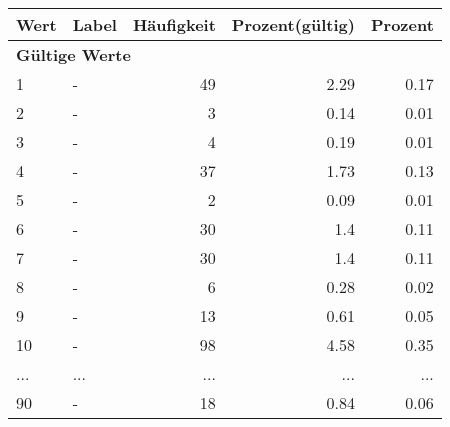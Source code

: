     \begin{longtable}{lXrrr}
     \toprule
     \textbf{Wert} & \textbf{Label} & \textbf{Häufigkeit} & \textbf{Prozent(gültig)} & \textbf{Prozent} \\
     \endhead
     \midrule
     \multicolumn{5}{l}{\textbf{Gültige Werte}}\\
        1 & \multicolumn{1}{X}{-} & %
          \num{49} &
          \num[round-mode=places,round-precision=2]{2.29} &
          \num[round-mode=places,round-precision=2]{0.17} \\
        2 & \multicolumn{1}{X}{-} & %
          \num{3} &
          \num[round-mode=places,round-precision=2]{0.14} &
          \num[round-mode=places,round-precision=2]{0.01} \\
        3 & \multicolumn{1}{X}{-} & %
          \num{4} &
          \num[round-mode=places,round-precision=2]{0.19} &
          \num[round-mode=places,round-precision=2]{0.01} \\
        4 & \multicolumn{1}{X}{-} & %
          \num{37} &
          \num[round-mode=places,round-precision=2]{1.73} &
          \num[round-mode=places,round-precision=2]{0.13} \\
        5 & \multicolumn{1}{X}{-} & %
          \num{2} &
          \num[round-mode=places,round-precision=2]{0.09} &
          \num[round-mode=places,round-precision=2]{0.01} \\
        6 & \multicolumn{1}{X}{-} & %
          \num{30} &
          \num[round-mode=places,round-precision=2]{1.4} &
          \num[round-mode=places,round-precision=2]{0.11} \\
        7 & \multicolumn{1}{X}{-} & %
          \num{30} &
          \num[round-mode=places,round-precision=2]{1.4} &
          \num[round-mode=places,round-precision=2]{0.11} \\
        8 & \multicolumn{1}{X}{-} & %
          \num{6} &
          \num[round-mode=places,round-precision=2]{0.28} &
          \num[round-mode=places,round-precision=2]{0.02} \\
        9 & \multicolumn{1}{X}{-} & %
          \num{13} &
          \num[round-mode=places,round-precision=2]{0.61} &
          \num[round-mode=places,round-precision=2]{0.05} \\
        10 & \multicolumn{1}{X}{-} & %
          \num{98} &
          \num[round-mode=places,round-precision=2]{4.58} &
          \num[round-mode=places,round-precision=2]{0.35} \\
       ... & ... & ... & ... & ... \\
        90 & \multicolumn{1}{X}{-} & %
          \num{18} &
          \num[round-mode=places,round-precision=2]{0.84} &
          \num[round-mode=places,round-precision=2]{0.06} \\


\end{longtable}
